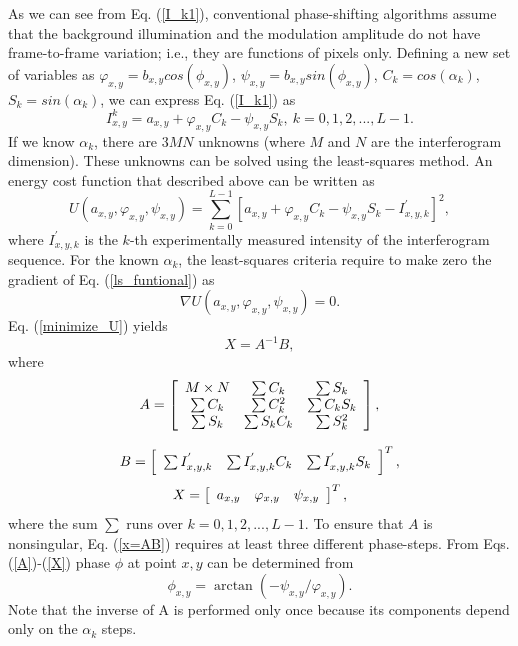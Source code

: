 \documentclass[letterpaper,12pt]{article}   %
\begin{document}
As we can see from Eq. (\ref{I_k1}), conventional phase-shifting algorithms assume that
the background illumination and the modulation amplitude do not have frame-to-frame
variation; i.e., they are functions of pixels only. Defining a new set of variables as
$\varphi_{x,y}=b_{x,y}cos(\phi_{x,y})$, $\psi_{x,y}=b_{x,y}sin(\phi_{x,y})$,
$C_k=cos(\alpha_k)$, $S_k=sin(\alpha_k)$, we can express Eq. (\ref{I_k1}) as
\begin{equation}\label{I_k2}
	I_{x,y}^k=a_{x,y}+\varphi_{x,y}C_k-\psi_{x,y}S_k,\: k=0,1,2,...,L-1.
\end{equation}
If we know $\alpha_k$, there are $3MN$ unknowns (where $M$ and $N$ are the interferogram
dimension). These unknowns can be solved using the least-squares method. An energy cost 
function that described above can be written as
\begin{equation}\label{ls_funtional}
	U(a_{x,y},\varphi_{x,y},\psi_{x,y})=\sum_{k=0}^{L-1}
	[a_{x,y}+\varphi_{x,y}C_k-\psi_{x,y}S_k-I_{x,y,k}^{'}]^2,
\end{equation}
where $I_{x,y,k}^{'}$ is the $k$-th experimentally measured intensity of the 
interferogram sequence. For the known $\alpha_k$, the least-squares criteria require to 
make zero the gradient of Eq. (\ref{ls_funtional}) as
\begin{equation}\label{minimize_U}
	\nabla U(a_{x,y},\varphi_{x,y},\psi_{x,y})=0.
\end{equation}
Eq. (\ref{minimize_U}) yields
\begin{equation}\label{x=AB}
	X = A^{-1} B,
\end{equation}
where
\begin{equation}\label{A}
	A = \left[ \begin{array}{c c c}
	M\times N & \sum C_k     & \sum S_k \\
	\sum C_k  & \sum C_k^2   & \sum C_k S_k \\
	\sum S_k  & \sum S_k C_k & \sum S_k^2\end{array} \right],
\end{equation}

\begin{equation}\label{B}
	B = \left[ \begin{array}{c c c}
	\sum I_{x,y,k}^{'} & \sum I_{x,y,k}^{'} C_k & \sum I_{x,y,k}^{'} S_k \end{array}
	\right]^T,
\end{equation}
\begin{equation}\label{X}
	X = \left[ \begin{array}{c c c}
	a_{x,y} & \varphi_{x,y} & \psi_{x,y} \end{array} \right]^T,
\end{equation}
where the sum $\sum$ runs over $k=0,1,2,...,L-1$. To ensure that $A$ is nonsingular, Eq.
(\ref{x=AB}) requires at least three different phase-steps. From Eqs.
(\ref{A})-(\ref{X}) phase $\phi$ at point $x,y$ can be determined from
\begin{equation}
	\phi_{x,y} = \arctan(-\psi_{x,y}/\varphi_{x,y}).
\end{equation}
Note that the inverse of A is performed only once because its components depend only on
the $\alpha_k$ steps.
\end{document}
